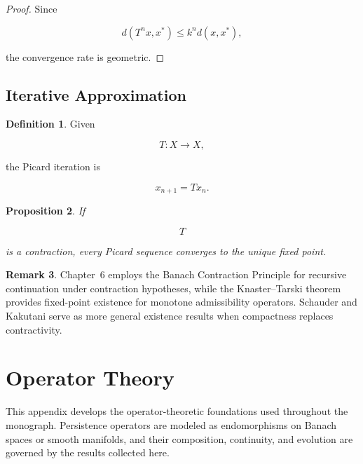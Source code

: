\documentclass[11pt]{book}
\numberwithin{equation}{chapter}
\theoremstyle{definition}
\newtheorem{definition}{Definition}[chapter]
\newtheorem{remark}[definition]{Remark}
\theoremstyle{plain}
\newtheorem{proposition}[definition]{Proposition}
\begin{document}
\begin{proof}

Since

\[
d(T^n x,x^*)
\le
k^n
d(x,x^*),
\]

the convergence rate is geometric.

\end{proof}


\section{Iterative Approximation}

\begin{definition}

Given

\[
T:X\rightarrow X,
\]

the Picard iteration is

\[
x_{n+1}=Tx_n.
\]

\end{definition}


\begin{proposition}

If

\[
T
\]

is a contraction, every Picard sequence converges to the unique fixed
point.

\end{proposition}


\begin{remark}

Chapter~6 employs the Banach Contraction Principle for recursive
continuation under contraction hypotheses, while the
Knaster--Tarski theorem provides fixed-point existence for monotone
admissibility operators. Schauder and Kakutani serve as more general
existence results when compactness replaces contractivity.

\end{remark}

\chapter{Operator Theory}

This appendix develops the operator-theoretic foundations used
throughout the monograph. Persistence operators are modeled as
endomorphisms on Banach spaces or smooth manifolds, and their
composition, continuity, and evolution are governed by the results
collected here.
\end{document}
